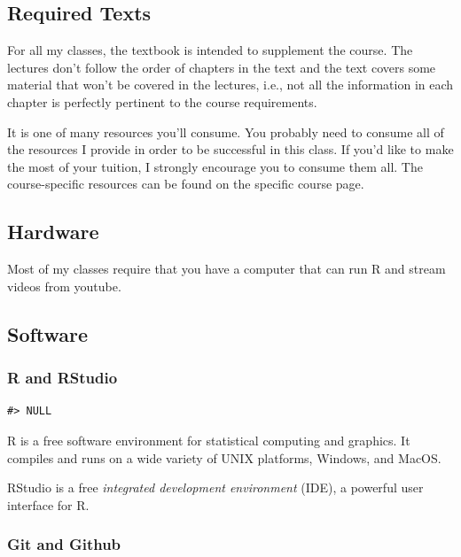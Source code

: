 \hypertarget{required-texts}{%
\subsection{Required Texts}\label{required-texts}}

For all my classes, the textbook is intended to supplement the course.
The lectures don't follow the order of chapters in the text and the text covers some material that won't be covered in the lectures, i.e., not all the information in each chapter is perfectly pertinent to the course requirements.

It is one of many resources you'll consume.
You probably need to consume all of the resources I provide in order to be successful in this class.
If you'd like to make the most of your tuition, I strongly encourage you to consume them all.
The course-specific resources can be found on the specific course page.

\hypertarget{hardware}{%
\subsection{Hardware}\label{hardware}}

Most of my classes require that you have a computer that can run R and stream videos from youtube.

\hypertarget{software}{%
\subsection{Software}\label{software}}

\hypertarget{r-and-rstudio}{%
\subsubsection{R and RStudio}\label{r-and-rstudio}}

\begin{verbatim}
#> NULL
\end{verbatim}

R is a free software environment for statistical computing and graphics. It compiles and runs on a wide variety of UNIX platforms, Windows, and MacOS.

RStudio is a free \emph{integrated development environment} (IDE), a powerful user interface for R.

\hypertarget{git-and-github}{%
\subsubsection{Git and Github}\label{git-and-github}}

